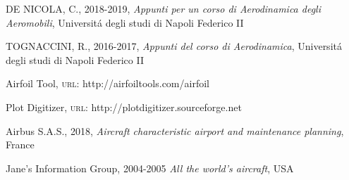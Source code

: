 \begin{thebibliography}{9}


DE NICOLA, C., 2018-2019, 
\emph{ Appunti per un corso di Aerodinamica degli Aeromobili}, Universitá degli studi di Napoli Federico II

TOGNACCINI, R., 2016-2017, 
\emph{Appunti del corso di Aerodinamica}, Universitá degli studi di Napoli Federico II

Airfoil Tool, {\scshape url: }{\color{red} http://airfoiltools.com/airfoil}

Plot Digitizer, {\scshape url: }{\color{red} http://plotdigitizer.sourceforge.net}


Airbus S.A.S., 2018,
\emph{Aircraft characteristic airport and maintenance planning}, France

Jane's Information Group, 2004-2005
\emph{All the world's aircraft}, USA




\end{thebibliography}